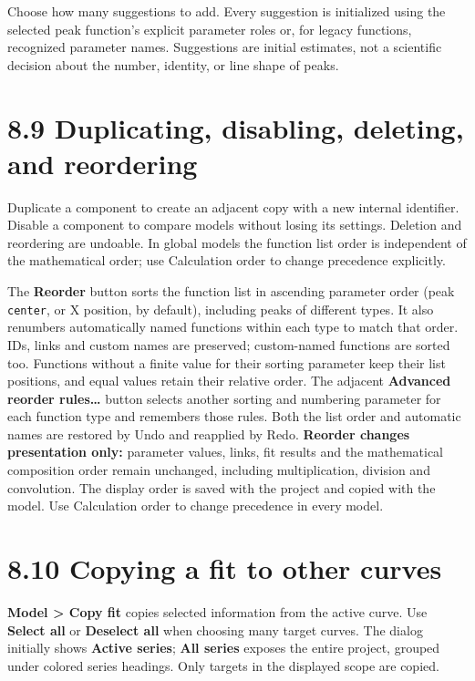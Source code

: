 \documentclass[
  10pt,
  a4paper,
  oneside]{scrreprt}
\begin{document}
Choose how many suggestions to add. Every suggestion is initialized
using the selected peak function's explicit parameter roles or, for
legacy functions, recognized parameter names. Suggestions are initial
estimates, not a scientific decision about the number, identity, or line
shape of peaks.

\hypertarget{duplicating-disabling-deleting-and-reordering}{%
\section{8.9 Duplicating, disabling, deleting, and
reordering}\label{duplicating-disabling-deleting-and-reordering}}

Duplicate a component to create an adjacent copy with a new internal
identifier. Disable a component to compare models without losing its
settings. Deletion and reordering are undoable. In global models the
function list order is independent of the mathematical order; use
Calculation order to change precedence explicitly.

The \textbf{Reorder} button sorts the function list in ascending
parameter order (peak \texttt{center}, or X position, by default),
including peaks of different types. It also renumbers automatically
named functions within each type to match that order. IDs, links and
custom names are preserved; custom-named functions are sorted too.
Functions without a finite value for their sorting parameter keep their
list positions, and equal values retain their relative order. The
adjacent \textbf{Advanced reorder rules\ldots{}} button selects another
sorting and numbering parameter for each function type and remembers
those rules. Both the list order and automatic names are restored by
Undo and reapplied by Redo. \textbf{Reorder changes presentation only:}
parameter values, links, fit results and the mathematical composition
order remain unchanged, including multiplication, division and
convolution. The display order is saved with the project and copied with
the model. Use Calculation order to change precedence in every model.

\hypertarget{copying-a-fit-to-other-curves}{%
\section{8.10 Copying a fit to other
curves}\label{copying-a-fit-to-other-curves}}

\textbf{Model \textgreater{} Copy fit} copies selected information from
the active curve. Use \textbf{Select all} or \textbf{Deselect all} when
choosing many target curves. The dialog initially shows \textbf{Active
series}; \textbf{All series} exposes the entire project, grouped under
colored series headings. Only targets in the displayed scope are copied.
\end{document}
